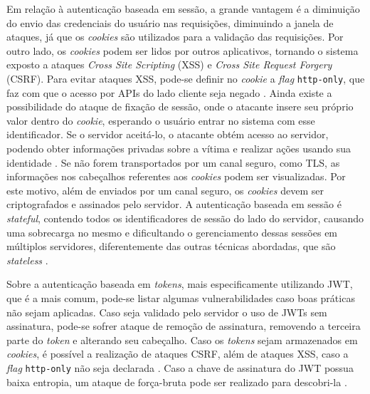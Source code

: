 Em relação à autenticação baseada em sessão, a grande vantagem é a diminuição do envio das 
credenciais do usuário nas requisições, diminuindo a janela de ataques, já que os \emph{cookies} 
são utilizados para a validação das requisições. Por outro lado, os \emph{cookies} podem ser lidos por 
outros aplicativos, tornando o sistema exposto a ataques \emph{Cross Site Scripting} (XSS) e 
\emph{Cross Site Request Forgery} (CSRF). Para evitar ataques XSS, pode-se definir no \emph{cookie} 
a \emph{flag} \texttt{http-only}, que faz com que o acesso por APIs do lado cliente seja negado 
\cite{PAPATHANASAKI2022}. Ainda existe a possibilidade do ataque de fixação de sessão, onde o 
atacante insere seu próprio valor
dentro do \emph{cookie}, esperando o usuário entrar no sistema com esse identificador. Se o servidor
aceitá-lo, o atacante obtém acesso ao servidor, podendo obter informações privadas sobre a vítima
e realizar ações usando sua identidade \cite{DRHOVA2018}. Se não forem transportados por um canal 
seguro, como TLS, as informações nos cabeçalhos referentes aos \emph{cookies} podem ser visualizadas. 
Por este motivo, além de enviados por um canal seguro, 
os \emph{cookies} devem ser criptografados e assinados pelo servidor\cite{RFC6265}. A autenticação 
baseada em sessão é \emph{stateful}, contendo todos os identificadores de sessão do
lado do servidor, causando uma sobrecarga no mesmo e dificultando o gerenciamento dessas sessões em
múltiplos servidores, diferentemente das outras técnicas abordadas, que são \emph{stateless} 
\cite{BALAJ2017}.


Sobre a autenticação baseada em \emph{tokens}, mais especificamente utilizando JWT, que é a mais 
comum, pode-se listar algumas vulnerabilidades caso boas práticas não sejam aplicadas. Caso seja
validado pelo servidor o uso de JWTs sem assinatura, pode-se sofrer ataque de remoção de assinatura,
removendo a terceira parte do \emph{token} e alterando seu cabeçalho. Caso os \emph{tokens} sejam
armazenados em \emph{cookies}, é possível a realização de ataques CSRF, além de ataques XSS, caso a
\emph{flag} \texttt{http-only} não seja declarada \cite{PEYROTT2018}. Caso a chave de assinatura
do JWT possua baixa entropia, um ataque de força-bruta pode ser realizado para descobri-la 
\cite{RFC7515}.

